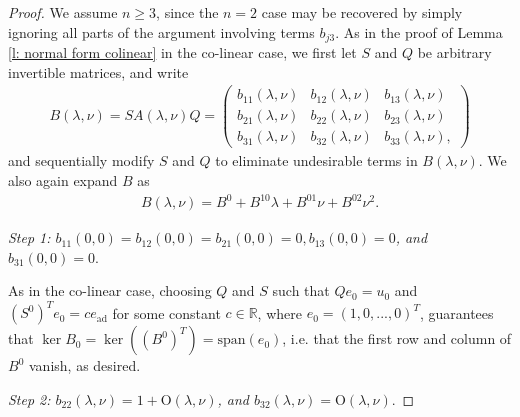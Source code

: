 \documentclass[11pt]{article}
\newcommand{\R}{\mathbb{R}}
\newcommand{\spn}{\text{\span}}
\numberwithin{equation}{section}
\numberwithin{prop}{section}
\renewcommand{\spn}{\mathrm{span}}
\newcommand{\bigo}{\mathrm{O}}
\begin{document}
\begin{proof}
	We assume $n \geq 3$, since the $n = 2$ case may be recovered by simply ignoring all parts of the argument involving terms $b_{j3}$. As in the proof of Lemma \ref{l: normal form colinear} in the co-linear case, we first let $S$ and $Q$ be arbitrary invertible matrices, and write 
	\begin{align}
	B(\lambda, \nu) = S A(\lambda, \nu) Q = \begin{pmatrix}
	b_{11} (\lambda, \nu) & b_{12}(\lambda, \nu) & b_{13}(\lambda, \nu) \\
	b_{21} (\lambda, \nu) & b_{22} (\lambda, \nu) & b_{23} (\lambda, \nu) \\
	b_{31}(\lambda, \nu) & b_{32}(\lambda, \nu) &  b_{33}(\lambda, \nu),
	\end{pmatrix}
	\end{align}
	and sequentially modify $S$ and $Q$ to eliminate undesirable terms in $B(\lambda, \nu)$. We also again expand $B$ as 
	\begin{align}
	B(\lambda, \nu) = B^0 + B^{10} \lambda + B^{01} \nu + B^{02} \nu^2. \label{e: lin ind B expansion}
	\end{align}
	
	\emph{Step 1: $b_{11}(0,0) = b_{12} (0,0) = b_{21} (0,0) = 0, b_{13}(0,0) = 0$, and $b_{31}(0,0) = 0$}. 
	
	As in the co-linear case, choosing $Q$ and $S$ such that $Q e_0 = u_0$ and $(S^0)^T e_0 = c e_\mathrm{ad}$ for some constant $c \in \R$, where $e_0 = (1, 0, ..., 0)^T$, guarantees that $\ker B_0 = \ker ((B^0)^T) = \spn(e_0)$, i.e. that the first row and column of $B^0$ vanish, as desired. 
	
	\emph{Step 2: $b_{22}(\lambda, \nu) = 1 + \mathrm{O}(\lambda, \nu)$, and $b_{32} (\lambda, \nu) = \bigo(\lambda, \nu)$}. 
	

\end{proof}
\end{document}
